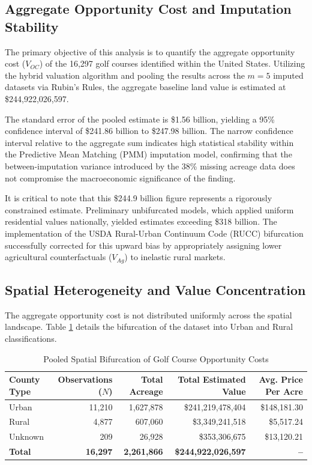 \documentclass[10pt, letterpaper]{article}
\begin{document}
\subsection{Aggregate Opportunity Cost and Imputation Stability}
The primary objective of this analysis is to quantify the aggregate opportunity cost ($V_{OC}$) of the 16,297 golf courses identified within the United States. Utilizing the hybrid valuation algorithm and pooling the results across the $m=5$ imputed datasets via Rubin's Rules, the aggregate baseline land value is estimated at \$244,922,026,597. 

The standard error of the pooled estimate is \$1.56 billion, yielding a 95\% confidence interval of \$241.86 billion to \$247.98 billion. The narrow confidence interval relative to the aggregate sum indicates high statistical stability within the Predictive Mean Matching (PMM) imputation model, confirming that the between-imputation variance introduced by the 38\% missing acreage data does not compromise the macroeconomic significance of the finding. 

It is critical to note that this \$244.9 billion figure represents a rigorously constrained estimate. Preliminary unbifurcated models, which applied uniform residential values nationally, yielded estimates exceeding \$318 billion. The implementation of the USDA Rural-Urban Continuum Code (RUCC) bifurcation successfully corrected for this upward bias by appropriately assigning lower agricultural counterfactuals ($V_{Ag}$) to inelastic rural markets.

\subsection{Spatial Heterogeneity and Value Concentration}
The aggregate opportunity cost is not distributed uniformly across the spatial landscape. Table \ref{tab:bifurcation} details the bifurcation of the dataset into Urban and Rural classifications.

\begin{table}[h!]
\centering
\caption{Pooled Spatial Bifurcation of Golf Course Opportunity Costs}
\label{tab:bifurcation}
\renewcommand{\arraystretch}{1.2}
\begin{tabular}{l r r r r}
\hline
\textbf{County Type} & \textbf{Observations ($N$)} & \textbf{Total Acreage} & \textbf{Total Estimated Value} & \textbf{Avg. Price Per Acre} \\
\hline
Urban & 11,210 & 1,627,878 & \$241,219,478,404 & \$148,181.30 \\
Rural & 4,877 & 607,060 & \$3,349,241,518 & \$5,517.24 \\
Unknown & 209 & 26,928 & \$353,306,675 & \$13,120.21 \\
\hline
\textbf{Total} & \textbf{16,297} & \textbf{2,261,866} & \textbf{\$244,922,026,597} & \textbf{--} \\
\hline
\end{tabular}
\end{table}
\end{document}
